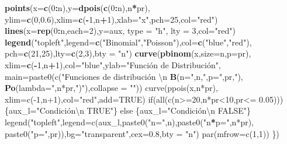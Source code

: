 \documentclass[]{book}
\newenvironment{Shaded}{\begin{snugshade}}{\end{snugshade}}
\newcommand{\DataTypeTok}[1]{\textcolor[rgb]{0.13,0.29,0.53}{#1}}
\newcommand{\DecValTok}[1]{\textcolor[rgb]{0.00,0.00,0.81}{#1}}
\newcommand{\FloatTok}[1]{\textcolor[rgb]{0.00,0.00,0.81}{#1}}
\newcommand{\KeywordTok}[1]{\textcolor[rgb]{0.13,0.29,0.53}{\textbf{#1}}}
\newcommand{\NormalTok}[1]{#1}
\newcommand{\OperatorTok}[1]{\textcolor[rgb]{0.81,0.36,0.00}{\textbf{#1}}}
\newcommand{\StringTok}[1]{\textcolor[rgb]{0.31,0.60,0.02}{#1}}
\begin{document}
\begin{Shaded}
\begin{Highlighting}[]
  \KeywordTok{points}\NormalTok{(}\DataTypeTok{x=}\KeywordTok{c}\NormalTok{(}\DecValTok{0}\OperatorTok{:}\NormalTok{n),}\DataTypeTok{y=}\KeywordTok{dpois}\NormalTok{(}\KeywordTok{c}\NormalTok{(}\DecValTok{0}\OperatorTok{:}\NormalTok{n),n}\OperatorTok{*}\NormalTok{pr),}
       \DataTypeTok{ylim=}\KeywordTok{c}\NormalTok{(}\DecValTok{0}\NormalTok{,}\FloatTok{0.6}\NormalTok{),}\DataTypeTok{xlim=}\KeywordTok{c}\NormalTok{(}\OperatorTok{-}\DecValTok{1}\NormalTok{,n}\OperatorTok{+}\DecValTok{1}\NormalTok{),}\DataTypeTok{xlab=}\StringTok{"x"}\NormalTok{,}\DataTypeTok{pch=}\DecValTok{25}\NormalTok{,}\DataTypeTok{col=}\StringTok{"red"}\NormalTok{)}
  \KeywordTok{lines}\NormalTok{(}\DataTypeTok{x=}\KeywordTok{rep}\NormalTok{(}\DecValTok{0}\OperatorTok{:}\NormalTok{n,}\DataTypeTok{each=}\DecValTok{2}\NormalTok{),}\DataTypeTok{y=}\NormalTok{aux, }\DataTypeTok{type =} \StringTok{"h"}\NormalTok{, }\DataTypeTok{lty =} \DecValTok{3}\NormalTok{,}\DataTypeTok{col=}\StringTok{"red"}\NormalTok{)}
  \KeywordTok{legend}\NormalTok{(}\StringTok{"topleft"}\NormalTok{,}\DataTypeTok{legend=}\KeywordTok{c}\NormalTok{(}\StringTok{"Binomial"}\NormalTok{,}\StringTok{"Poisson"}\NormalTok{),}\DataTypeTok{col=}\KeywordTok{c}\NormalTok{(}\StringTok{"blue"}\NormalTok{,}\StringTok{"red"}\NormalTok{), }
         \DataTypeTok{pch=}\KeywordTok{c}\NormalTok{(}\DecValTok{21}\NormalTok{,}\DecValTok{25}\NormalTok{),}\DataTypeTok{lty=}\KeywordTok{c}\NormalTok{(}\DecValTok{2}\NormalTok{,}\DecValTok{3}\NormalTok{),}\DataTypeTok{bty =} \StringTok{"n"}\NormalTok{)}
  \KeywordTok{curve}\NormalTok{(}\KeywordTok{pbinom}\NormalTok{(x,}\DataTypeTok{size=}\NormalTok{n,}\DataTypeTok{p=}\NormalTok{pr),}
        \DataTypeTok{xlim=}\KeywordTok{c}\NormalTok{(}\OperatorTok{-}\DecValTok{1}\NormalTok{,n}\OperatorTok{+}\DecValTok{1}\NormalTok{),}\DataTypeTok{col=}\StringTok{"blue"}\NormalTok{,}\DataTypeTok{ylab=}\StringTok{"Función de Distribución",}
\StringTok{         main=paste0(c("}\NormalTok{Funciones de distribución \textbackslash{}n }\KeywordTok{B}\NormalTok{(}\DataTypeTok{n=}\StringTok{",n,"}\NormalTok{,}\DataTypeTok{p=}\StringTok{",pr,"}\NormalTok{),}
                       \KeywordTok{Po}\NormalTok{(}\DataTypeTok{lambda=}\StringTok{",n*pr,"}\NormalTok{)}\StringTok{"),collapse = ""))}
\StringTok{  curve(ppois(x,n*pr),}
\StringTok{        xlim=c(-1,n+1),col="}\NormalTok{red}\StringTok{",add=TRUE)}
\StringTok{  if(all(c(n>=20,n*pr<10,pr<= 0.05)))\{aux_l="}\NormalTok{Condición\textbackslash{}n TRUE}\StringTok{"\} else }
\StringTok{    \{aux_l="}\NormalTok{Condición\textbackslash{}n FALSE}\StringTok{"\}}
\StringTok{  legend("}\NormalTok{topleft}\StringTok{",legend=c(aux_l,paste0("}\DataTypeTok{n=}\StringTok{",n),paste0("}\NormalTok{n}\OperatorTok{*}\DataTypeTok{p=}\StringTok{",n*pr),}
\StringTok{                            paste0("}\DataTypeTok{p=}\StringTok{",pr)),bg="}\NormalTok{transparent}\StringTok{",cex=0.8,bty = "}\NormalTok{n}\StringTok{")}
\StringTok{  par(mfrow=c(1,1))}
\StringTok{\})}
\end{Highlighting}
\end{Shaded}
\end{document}
